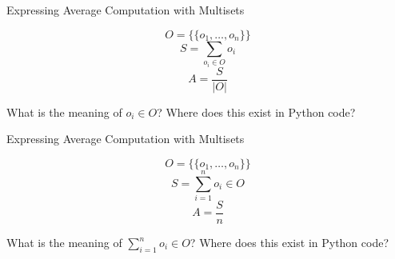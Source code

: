 \documentclass[14pt,aspectratio=169]{beamer}
\begin{document}
%
\begin{frame}{Expressing Average Computation with Multisets}
  \vspace*{-.5in}
  \begin{center}
  \fontsize{20}{30}\selectfont
    \begin{equation*}
     O = \{\!\{o_1, \ldots, o_n\}\!\}
    \end{equation*}
    \begin{equation*}
      S = \sum_{o_i \in O} o_i
    \end{equation*}
    \begin{equation*}
      A = \frac{S}{|O|}
    \end{equation*}
  \end{center}
  \vspace{2ex}
  \begin{center}
    \small What is the meaning of $o_i \in O$? Where does this exist in Python code?
  \end{center}
\end{frame}

%
\begin{frame}{Expressing Average Computation with Multisets}
  \vspace*{-.5in}
  \begin{center}
  \fontsize{20}{30}\selectfont
    \begin{equation*}
     O = \{\!\{o_1, \ldots, o_n\}\!\}
    \end{equation*}
    \begin{equation*}
      S = \sum_{i=1}^{n} o_i \in O
    \end{equation*}
    \begin{equation*}
      A = \frac{S}{n}
    \end{equation*}
  \end{center}
  \vspace{2ex}
  \begin{center}
    \small What is the meaning of $\sum_{i=1}^{n} o_i \in O$? Where does this exist in Python code?
  \end{center}
\end{frame}
\end{document}
